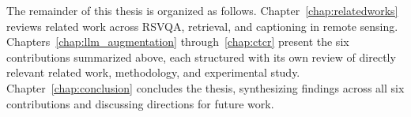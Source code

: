 The remainder of this thesis is organized as follows. Chapter~\ref{chap:relatedworks} reviews related work across RSVQA, retrieval, and captioning in remote sensing. Chapters~\ref{chap:llm_augmentation} through~\ref{chap:ctcr} present the six contributions summarized above, each structured with its own review of directly relevant related work, methodology, and experimental study. Chapter~\ref{chap:conclusion} concludes the thesis, synthesizing findings across all six contributions and discussing directions for future work.
 
